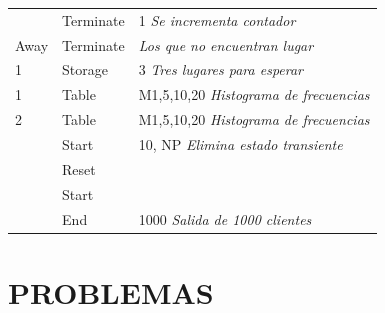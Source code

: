 \documentclass[11pt,letterpaper]{report}
\begin{document}
\begin{table}[H]
\begin{tabular}{lll}
 & Terminate & 1 \quad \textit{Se incrementa contador} \\
Away & Terminate & \textit{Los que no encuentran lugar} \\
1 & Storage & 3 \quad \textit{Tres lugares para esperar} \\
1 & Table & M1,5,10,20 \quad \textit{Histograma de frecuencias} \\
2 & Table & M1,5,10,20 \quad \textit{Histograma de frecuencias} \\
 & Start & 10, NP \quad \textit{Elimina estado transiente} \\
 & Reset & \\
 & Start & \\
 & End & 1000 \quad \textit{Salida de 1000 clientes} \\
\bottomrule
\end{tabular}
\end{table}

\section*{PROBLEMAS}
\end{document}

